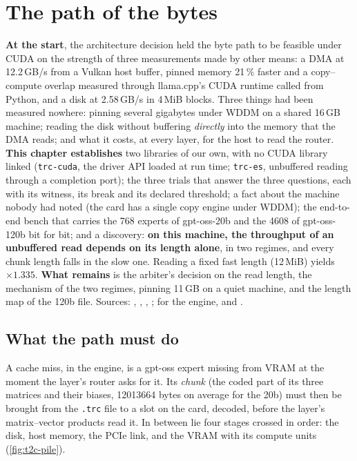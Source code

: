 \chapter{The path of the bytes}\label{ch:t2-chemin}
\ifdefined\GrapheChmSync\else\fi

\begin{origine}
\textbf{At the start}, the architecture decision held the byte path to be feasible under CUDA on the strength of three measurements made by other means: a DMA at 12.2\,GB/s from a Vulkan host buffer, pinned memory 21\,\% faster and a copy--compute overlap measured through llama.cpp's CUDA runtime called from Python, and a disk at 2.58\,GB/s in 4\,MiB blocks. Three things had been measured nowhere: pinning several gigabytes under WDDM on a shared 16\,GB machine; reading the disk without buffering \emph{directly} into the memory that the DMA reads; and what it costs, at every layer, for the host to read the router.
\textbf{This chapter establishes} two libraries of our own, with no CUDA library linked (\texttt{trc-cuda}, the driver API loaded at run time; \texttt{trc-es}, unbuffered reading through a completion port); the three trials that answer the three questions, each with its witness, its break and its declared threshold; a fact about the machine nobody had noted (the card has a single copy engine under WDDM); the end-to-end bench that carries the \num{768} experts of gpt-oss-20b and the \num{4608} of gpt-oss-120b bit for bit; and a discovery: \textbf{on this machine, the throughput of an unbuffered read depends on its length alone}, in two regimes, and every chunk length falls in the slow one. Reading a fixed fast length (12\,MiB) yields $\times 1.335$.
\textbf{What remains} is the arbiter's decision on the read length, the mechanism of the two regimes, pinning 11\,GB on a quiet machine, and the length map of the 120b file.
Sources: , , , ; for the engine,  and .
\end{origine}

\section{What the path must do}\label{sec:t2c-tache}

A cache miss, in the engine, is a gpt-oss expert missing from VRAM at the moment the layer's router asks for it. Its \emph{chunk} (the coded part of its three matrices and their biases, \num{12013664} bytes on average for the 20b) must then be brought from the \texttt{.trc} file to a slot on the card, decoded, before the layer's matrix--vector products read it. In between lie four stages crossed in order: the disk, host memory, the PCIe link, and the VRAM with its compute units (\cref{fig:t2c-pile}).

